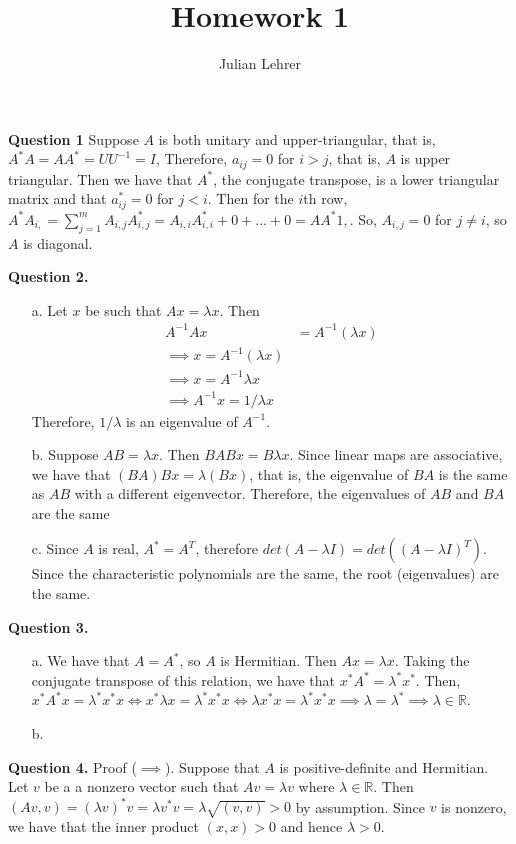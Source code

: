 \documentclass{article}
\title{Homework 1}
\date{}
\author{Julian Lehrer}
\newcommand{\R}{\mathbb{R}}
\begin{document}
\maketitle
\textbf{Question 1}
Suppose $A$ is both unitary and upper-triangular, that is,
$A^*A=AA^*=UU^{-1}=I$, Therefore, $a_{ij} = 0$ for $i > j$, that is, $A$ is upper triangular. Then we have that $A^*$, the conjugate transpose, is a lower triangular matrix and that $a^*_{ij} = 0$ for $j < i$. Then for the $i$th row, $A^*A_{i, } = \sum_{j=1}^m A_{i, j}A^*_{i, j}=A_{i, i}A^{*}_{i, i }+ 0+...+0 = AA^*{1, }$. So, $A_{i,j}=0$ for $j \neq i$, so $A$ is diagonal. 

\textbf{Question 2.} 
\begin{itemize}
    \item[a.] Let $x$ be such that $Ax =\lambda x$. Then 
    \begin{align*}
        A^{-1}Ax &= A^{-1}\left(\lambda x\right) \\ 
        \implies x = A^{-1}\left(\lambda x\right)\\
        \implies x=A^{-1}\lambda x \\
        \implies A^{-1}x = 1/\lambda x
    \end{align*}
    Therefore, $1/\lambda$ is an eigenvalue of $A^{-1}$. 
    \item[b.] Suppose $AB = \lambda x$. Then $BAB x= B\lambda x$. Since linear maps are associative, we have that $(BA)Bx = \lambda(Bx)$, that is, the eigenvalue of $BA$ is the same as $AB$ with a different eigenvector. Therefore, the eigenvalues of $AB$ and $BA$ are the same 
    \item[c.] Since $A$ is real, $A^* = A^T$, therefore $det(A-\lambda I) = det((A-\lambda I)^T)$. Since the characteristic polynomials are the same, the root (eigenvalues) are the same. 
\end{itemize}

\textbf{Question 3.} 
\begin{itemize}
    \item[a.] We have that $A = A^*$, so $A$ is Hermitian. Then $Ax = \lambda x$. Taking the conjugate transpose of this relation, we have that $x^*A^* = \lambda^*x^*$. Then, $x^*A^*x = \lambda^*x^* x \iff x^*\lambda x = \lambda^*x^*x \iff \lambda x^*x = \lambda^* x^*x \implies \lambda = \lambda^* \implies \lambda \in \R$. 
    \item[b.] 
\end{itemize}

\textbf{Question 4.} Proof ($\implies$). Suppose that $A$ is positive-definite and Hermitian. Let $v$ be a a nonzero vector such that $Av = \lambda v$ where $\lambda \in \R$. Then $(Av, v) = (\lambda v)^* v = \lambda v^*v = \lambda \sqrt{(v,v)} > 0$ by assumption. Since $v$ is nonzero, we have that the inner product $(x,x) > 0$ and hence $\lambda > 0$. \\
\end{document}
